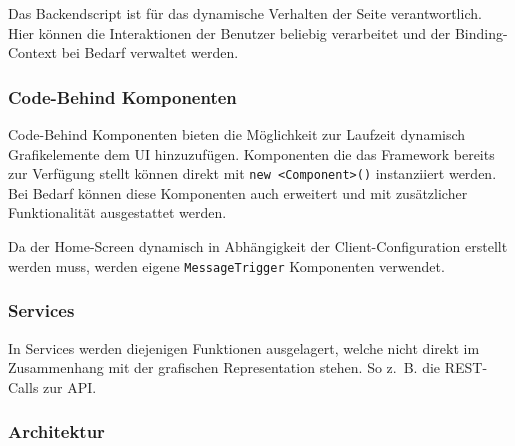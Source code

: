 Das Backendscript ist für das dynamische Verhalten der Seite verantwortlich.
Hier können die Interaktionen der Benutzer beliebig verarbeitet und der Binding-Context bei Bedarf verwaltet werden.



\subsubsection*{Code-Behind Komponenten}\label{subsubsec:code-behind-komponenten}
Code-Behind Komponenten bieten die Möglichkeit zur Laufzeit dynamisch Grafikelemente dem UI hinzuzufügen.
Komponenten die das Framework bereits zur Verfügung stellt können direkt mit \texttt{new \textless Component\textgreater()} instanziiert werden.
Bei Bedarf können diese Komponenten auch erweitert und mit zusätzlicher Funktionalität ausgestattet werden.

Da der Home-Screen dynamisch in Abhängigkeit der Client-Configuration erstellt werden muss, werden eigene \texttt{MessageTrigger} Komponenten verwendet.
\subsubsection*{Services}\label{subsubsec:services}
In Services werden diejenigen Funktionen ausgelagert, welche nicht direkt im Zusammenhang mit der grafischen Representation stehen.
So z.~B. die REST-Calls zur API.

\clearpage

\subsubsection{Architektur}



